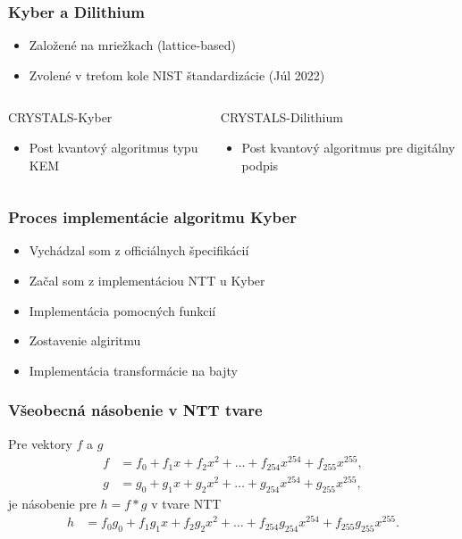 \documentclass[%
  14pt,       				%
	t,                  %
	aspectratio=1610,   %
	unicode,						%
]{beamer}				    	%
\begin{document}
\begin{frame}[c]
	\frametitle{Kyber a Dilithium}
	\large{
		\begin{itemize}
			\item Založené na mriežkach (lattice-based)
			\item Zvolené v treťom kole NIST štandardizácie (Júl 2022)
		\end{itemize}
		\vspace{3ex}
		\begin{columns}[T]
			\begin{column}{0.5\textwidth}
				CRYSTALS-Kyber
				\begin{itemize}
					\item Post kvantový algoritmus typu KEM
				\end{itemize}
			\end{column}
			\begin{column}{0.5\textwidth}
				CRYSTALS-Dilithium
				\begin{itemize}
					\item Post kvantový algoritmus pre digitálny podpis
				\end{itemize}
			\end{column}
		\end{columns}
	}
\end{frame}

\begin{frame}[c]
	\frametitle{Proces implementácie algoritmu Kyber}
	\large{
		\begin{itemize}
			\item Vychádzal som z officiálnych špecifikácií
			\item Začal som z implementáciou NTT u Kyber
			\item Implementácia pomocných funkcií
			\item Zostavenie algiritmu
			\item Implementácia transformácie na bajty
		\end{itemize}
	}
\end{frame}

\begin{frame}[c]
	\frametitle{Všeobecná násobenie v NTT tvare}
	\large{
		Pre vektory $f$ a $g$
		\begin{align*}
			f & = f_0 + f_1x + f_2x^2 + \dots + f_{254}x^{254} + f_{255}x^{255}, \\
			g & = g_0 + g_1x + g_2x^2 + \dots + g_{254}x^{254} + g_{255}x^{255},
		\end{align*}
		je násobenie pre $h=f*g$ v tvare NTT
		\begin{align*}
			h & = f_0g_0 + f_1g_1x + f_2g_2x^2 + \dots + f_{254}g_{254}x^{254} + f_{255}g_{255}x^{255}.
		\end{align*}
	}
\end{frame}
\end{document}
